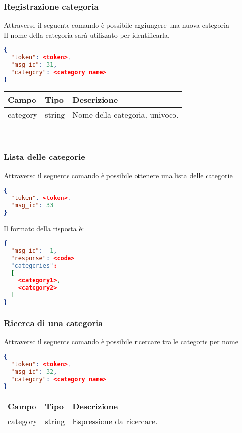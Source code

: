 \subsubsection{Registrazione categoria}
Attraverso il seguente comando è possibile aggiungere una nuova categoria\\
Il nome della categoria sarà utilizzato per identificarla.

\begin{lstlisting}[language=json]
{
  "token": <token>,
  "msg_id": 31,
  "category": <category name>
}
\end{lstlisting}

\begin{tabular}{|l | l | l |}
\hline
Campo & Tipo & Descrizione \\ \hline
category & string & Nome della categoria, univoco.\\ \hline
\end{tabular} \\
\subsubsection{Lista delle categorie}
Attraverso il seguente comando è possibile ottenere una lista delle categorie
\begin{lstlisting}[language=json]
{
  "token": <token>,
  "msg_id": 33
}
\end{lstlisting}

Il formato della risposta è:
\begin{lstlisting}[language=json]
{
  "msg_id": -1,
  "response": <code>
  "categories":
  [
    <category1>,
    <category2>
  ]
}
\end{lstlisting}
\subsubsection{Ricerca di una categoria}
Attraverso il seguente comando è possibile ricercare tra le categorie per nome
\begin{lstlisting}[language=json]
{
  "token": <token>,
  "msg_id": 32,
  "category": <category name>
}
\end{lstlisting}

\begin{tabular}{|l | l | l |}
\hline
Campo & Tipo & Descrizione \\ \hline
category & string & Espressione da ricercare.\\ \hline
\end{tabular} \\

